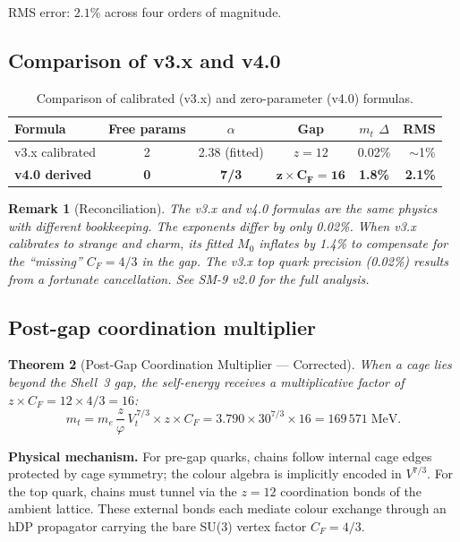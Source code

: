 \documentclass[11pt,letterpaper]{article}
\newtheorem{theorem}{Theorem}[section]
\newtheorem{remark}[theorem]{Remark}
\newcommand{\phig}{\varphi}
\begin{document}
\noindent RMS error: $2.1\%$ across four orders of magnitude.

\subsection{Comparison of v3.x and v4.0}

\begin{table}[H]
\centering
\caption{Comparison of calibrated (v3.x) and zero-parameter (v4.0)
formulas.}
\label{tab:comparison}
\begin{tabular}{@{}lccccr@{}}
\toprule
Formula & Free params & $\alpha$ & Gap & $m_t$ $\Delta$ & RMS \\
\midrule
v3.x calibrated & 2 & 2.38 (fitted) & $z = 12$ & 0.02\% & $\sim$1\% \\
\textbf{v4.0 derived} & \textbf{0} & \textbf{7/3} & $\boldsymbol{z \times C_F = 16}$
  & \textbf{1.8\%} & \textbf{2.1\%} \\
\bottomrule
\end{tabular}
\end{table}

\begin{remark}[Reconciliation]
The v3.x and v4.0 formulas are the same physics with different
bookkeeping.  The exponents differ by only 0.02\%.  When v3.x
calibrates to strange and charm, its fitted $M_0$ inflates by 1.4\%
to compensate for the ``missing'' $C_F = 4/3$ in the gap.  The v3.x
top quark precision (0.02\%) results from a fortunate cancellation.
See SM-9 v2.0 for the full analysis.
\end{remark}

\subsection{Post-gap coordination multiplier}
\label{sec:top-boost}

\begin{theorem}[Post-Gap Coordination Multiplier --- Corrected]
\label{thm:postgap}
When a cage lies beyond the Shell~3 gap, the self-energy receives
a multiplicative factor of $z \times C_F = 12 \times 4/3 = 16$:
\begin{equation}
m_t = m_e \,\frac{z}{\phig}\, V_t^{\,7/3} \times z \times C_F
    = 3.790 \times 30^{7/3} \times 16
    = 169\,571\;\text{MeV}.
\label{eq:top_v4}
\end{equation}
\end{theorem}

\noindent\textbf{Physical mechanism.}
For pre-gap quarks, chains follow internal cage edges protected by
cage symmetry; the colour algebra is implicitly encoded in
$V^{7/3}$.  For the top quark, chains must tunnel via the $z = 12$
coordination bonds of the ambient lattice.  These external bonds
each mediate colour exchange through an hDP propagator carrying the
bare SU(3) vertex factor $C_F = 4/3$.
\end{document}
